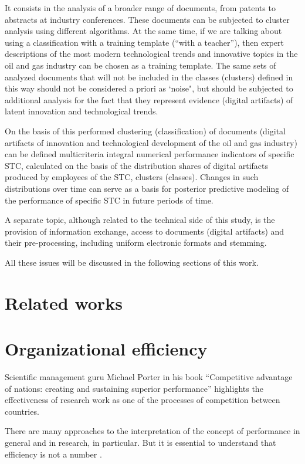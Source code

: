 \documentclass[12pt]{report}
\theoremstyle{definition}
\begin{document}
It consists in the analysis of a broader range of documents, from patents to abstracts at industry conferences.
These documents can be subjected to cluster analysis using different algorithms.
At the same time, if we are talking about using a classification with a training template (``with a teacher''), then expert descriptions of the most modern technological trends and innovative topics in the oil and gas industry can be chosen as a training template.
The same sets of analyzed documents that will not be included in the classes (clusters) defined in this way should not be considered a priori as `noise", but should be subjected to additional analysis for the fact that they represent evidence (digital artifacts) of latent innovation and technological trends.

On the basis of this performed clustering (classification) of documents (digital artifacts of innovation and technological development of the oil and gas industry) can be defined multicriteria integral numerical performance indicators of specific STC, calculated on the basis of the distribution shares of digital artifacts produced by employees of the STC, clusters (classes).
Changes in such distributions over time can serve as a basis for posterior predictive modeling of the performance of specific STC in future periods of time.

A separate topic, although related to the technical side of this study, is the provision of information exchange, access to documents (digital artifacts) and their pre-processing, including uniform electronic formats and stemming.

All these issues will be discussed in the following sections of this work.

\section{Related works}
\section{Organizational efficiency}

Scientific management guru Michael Porter in his book ``Competitive advantage of nations: creating and sustaining superior performance'' \autocite{porter2011competitive} highlights the effectiveness of research work as one of the processes of competition between countries. 

There are many approaches to the interpretation of the concept of performance in general and in research, in particular. 
But it is essential to understand that efficiency is not a number \autocite{quinn1983spatial, wolfe1994organizational, daft2010organization}.
\end{document}
